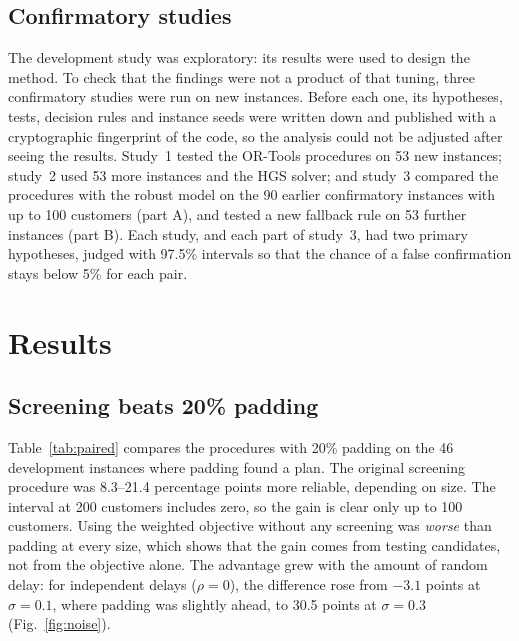 \documentclass[12pt,letterpaper]{article}
\newcommand{\ProcConsRange}{8.3--21.4}
\newcommand{\SweepLowIndep}{-3.1}
\newcommand{\SweepHighIndep}{30.5}
\begin{document}
\subsection{Confirmatory studies}

The development study was exploratory: its results were used to design the
method. To check that the findings were not a product of that tuning, three
confirmatory studies were run on new instances. Before each one, its hypotheses,
tests, decision rules and instance seeds were written down and published with a
cryptographic fingerprint of the code\cite{ali2026freeze,ali2026freeze2,ali2026freeze3},
so the analysis could not be adjusted after seeing the results. Study~1 tested the
OR-Tools procedures on 53 new instances; study~2 used 53 more instances and the
HGS solver; and study~3 compared the procedures with the robust model on the 90
earlier confirmatory instances with up to 100 customers (part A), and tested a new
fallback rule on 53 further instances (part B). Each study, and each part of
study~3, had two primary hypotheses, judged with 97.5\% intervals so that the chance
of a false confirmation stays below 5\% for each pair.

\section{Results}

\subsection{Screening beats 20\% padding}

Table~\ref{tab:paired} compares the procedures with 20\% padding on the 46
development instances where padding found a plan. The original screening
procedure was \ProcConsRange{} percentage points more reliable, depending on size.
The interval at 200 customers includes zero, so the gain is clear only up to 100
customers. Using the weighted objective without any screening was \emph{worse} than
padding at every size, which shows that the gain comes from testing candidates, not
from the objective alone. The advantage grew with the amount of random delay: for
independent delays ($\rho=0$), the difference rose from $\SweepLowIndep$ points at
$\sigma=0.1$, where padding was slightly ahead, to \SweepHighIndep{} points at
$\sigma=0.3$ (Fig.~\ref{fig:noise}).
\end{document}
